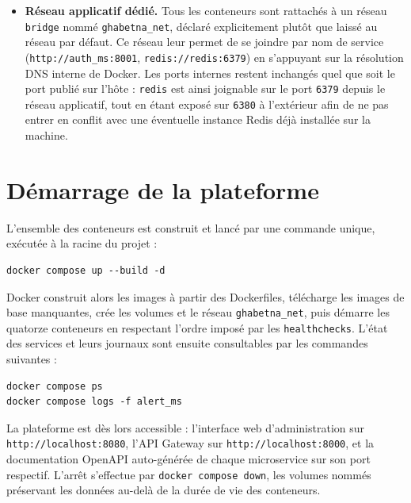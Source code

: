 \begin{itemize}
  \item \textbf{Réseau applicatif dédié.} Tous les conteneurs sont rattachés
        à un réseau \texttt{bridge} nommé \texttt{ghabetna\_net}, déclaré
        explicitement plutôt que laissé au réseau par défaut. Ce réseau leur
        permet de se joindre par nom de service
        (\texttt{http://auth\_ms:8001}, \texttt{redis://redis:6379}) en
        s'appuyant sur la résolution DNS interne de Docker. Les ports
        internes restent inchangés quel que soit le port publié sur l'hôte :
        \texttt{redis} est ainsi joignable sur le port \texttt{6379} depuis
        le réseau applicatif, tout en étant exposé sur \texttt{6380} à
        l'extérieur afin de ne pas entrer en conflit avec une éventuelle
        instance Redis déjà installée sur la machine.
\end{itemize}

\section*{Démarrage de la plateforme}

L'ensemble des conteneurs est construit et lancé par une commande unique,
exécutée à la racine du projet :

\begin{verbatim}
docker compose up --build -d
\end{verbatim}

Docker construit alors les images à partir des Dockerfiles, télécharge les
images de base manquantes, crée les volumes et le réseau
\texttt{ghabetna\_net}, puis démarre les quatorze conteneurs en respectant
l'ordre imposé par les \texttt{healthchecks}. L'état des services et leurs
journaux sont ensuite consultables par les commandes suivantes :

\begin{verbatim}
docker compose ps
docker compose logs -f alert_ms
\end{verbatim}

La plateforme est dès lors accessible : l'interface web d'administration sur
\texttt{http://localhost:8080}, l'API Gateway sur
\texttt{http://localhost:8000}, et la documentation OpenAPI auto-générée de
chaque microservice sur son port respectif. L'arrêt s'effectue par
\texttt{docker compose down}, les volumes nommés préservant les données
au-delà de la durée de vie des conteneurs.
